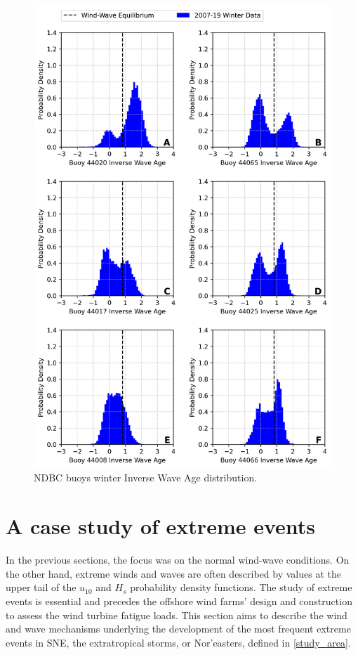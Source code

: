 \begin{figure}[H]
\centering
\includegraphics[width=0.95\linewidth]{Figures/Chapter5/inv_wave_age_pdfs_winter.png}
\caption{NDBC buoys winter Inverse Wave Age distribution.}
\label{fig:inv_wave_age_buoys_winter}
\end{figure}


\section{A case study of extreme events}\label{extreme_event}

In the previous sections, the focus was on the normal wind-wave conditions. On the other hand, extreme winds and waves are often described by values at the upper tail of the $u_{10}$ and $H_{s}$ probability density functions. The study of extreme events is essential and precedes the offshore wind farms' design and construction to assess the wind turbine fatigue loads.
This section aims to describe the wind and wave mechanisms underlying the development of the most frequent extreme events in SNE, the extratropical storms, or Nor'easters, defined in \ref{study_area}. 


